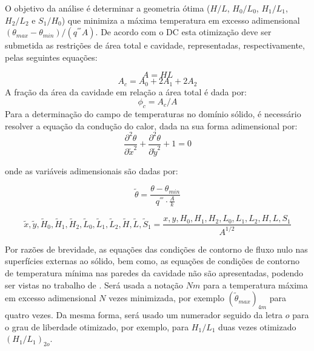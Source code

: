 \documentclass[12pt,A4,A4pt]{article}
\begin{document}
O objetivo da análise é determinar a geometria ótima ($H/L$, $H_{0}/L_{0}$, $H_{1}/L_{1}$, $H_{2}/L_{2}$ e $S_{1}/H_{0}$) que minimiza a máxima temperatura em excesso adimensional $(\theta_{max} - \theta_{min})/(q^{'''}A)$. De acordo com o DC esta otimização deve ser submetida as restrições de área total e cavidade, representadas, respectivamente, pelas seguintes equações:

\begin{equation}
A = HL \label{area_total}
\end{equation}
\begin{equation}
A_{c} = A_{0} + 2A_{1} + 2A_{2} \label{area_cavidade}
\end{equation}
A fração da área da cavidade em relação a área total é dada por:
\begin{equation}
\phi_{c} = A_{c}/A \label{fi}
\end{equation}
Para a determinação do campo de temperaturas no domínio sólido, é necessário resolver a equação da condução do calor, dada  na sua forma adimensional por:
\begin{equation}
\frac{\partial^{2} \theta}{\partial \tilde{x}^{2}}+\frac{\partial^{2} \theta}{\partial \tilde{y}^{2}}+1=0 \label{calor}
\end{equation}

onde as variáveis adimensionais são dadas por:

\begin{equation}
\tilde{\theta} = \frac{\theta - \theta_{min}}{q^{'''}\cdot\frac{A}{k}}\label{tadim}
\end{equation}

\begin{equation}
\tilde{x},\tilde{y},\tilde{H}_{0},\tilde{H}_{1},\tilde{H}_{2},\tilde{L}_{0},\tilde{L}_{1},\tilde{L}_{2},\tilde{H},\tilde{L},\tilde{S}_{1} = \frac{x,y,H_{0},H_{1},H_{2},L_{0},L_{1},L_{2},H,L,S_{1}}{A^{1/2}}\label{vadim}
\end{equation}

Por razões de brevidade, as equações das condições de contorno de fluxo nulo nas superfícies externas ao sólido, bem como, as equações de condições de contorno de temperatura mínima nas paredes da cavidade não são apresentadas, podendo ser vistas no trabalho de  \cite{Gonzales2015cilamce}. Será usada a notação $Nm$ para a temperatura máxima em excesso adimensional $N$ vezes minimizada, por exemplo $(\tilde{\theta} _{max})_{4m}$ para quatro vezes. Da mesma forma, será usado um numerador seguido da letra $o$ para o grau de liberdade otimizado, por exemplo, para $H_{1}/L_{1}$ duas vezes otimizado $(H_{1}/L_{1})_{2o}$.
\end{document}
